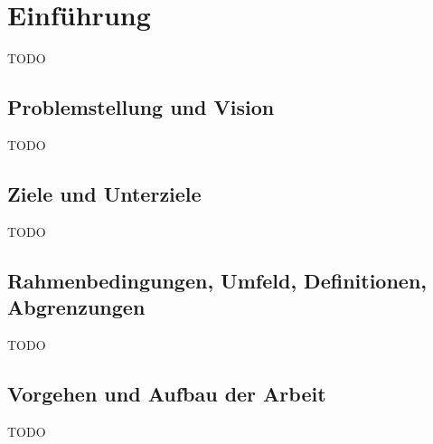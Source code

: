 \section{Einführung}
\label{sec:Einführung}
TODO

\subsection{Problemstellung und Vision}
\label{sub:Problemstellung und Vision}
TODO

\subsection{Ziele und Unterziele}
\label{sub:Ziele und Unterziele}
TODO

\subsection{Rahmenbedingungen, Umfeld, Definitionen, Abgrenzungen}
\label{sub:Rahmenbedingungen, Umfeld, Definitionen, Abgrenzungen}
TODO

\subsection{Vorgehen und Aufbau der Arbeit}
\label{sub:Vorgehen und Aufbau der Arbeit}
TODO
